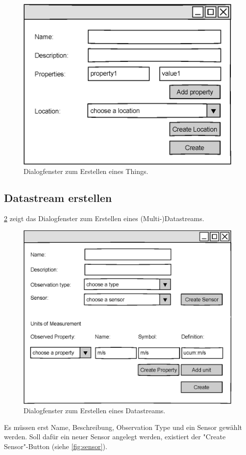 \documentclass[a4paper, 12 pt]{article}
\begin{document}
\begin{figure}[htbp]
\centering
\includegraphics[scale=0.8]{images/thing}
\caption{\label{fig:thing}Dialogfenster zum Erstellen eines Things.}
\end{figure}


\subsection{Datastream erstellen}
\cref{fig:ds} zeigt das Dialogfenster zum Erstellen eines (Multi-)Datastreams. 
\begin{figure}[htbp]
\centering
\includegraphics[scale=0.8]{images/datastream}
\caption{\label{fig:ds}Dialogfenster zum Erstellen eines Datastreams.}
\end{figure}
Es müssen erst Name, Beschreibung, Observation Type und ein Sensor gewählt werden. Soll dafür ein neuer Sensor angelegt werden, existiert der "{Create Sensor}"{-Button} (siehe \cref{fig:sensor}).\\
\end{document}
